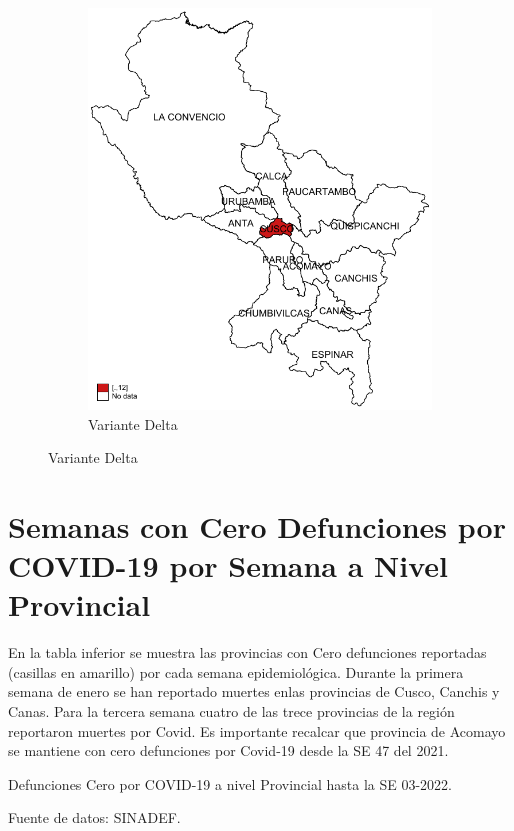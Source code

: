 \documentclass[12pt,a4paper,openany]{book}
\begin{document}
\begin{figure}[h]
\begin{subfigure}[b]{0.40\textwidth}
				\includegraphics[width=\textwidth]{../figuras/variantes_provincial_omicron.pdf}
				\caption{Variante Delta}
			\end{subfigure}
			\end{figure}

\clearpage


\clearpage
	\section*{Semanas con Cero Defunciones por COVID-19 por Semana a Nivel Provincial}
	
	\noindent En la tabla inferior se muestra las provincias con Cero defunciones reportadas (casillas en amarillo) por cada semana epidemiológica. Durante la primera semana de enero se han reportado muertes enlas provincias de Cusco, Canchis y Canas. Para la tercera semana cuatro de las trece provincias de la región reportaron muertes por Covid. Es importante recalcar que provincia de Acomayo se mantiene con cero defunciones por Covid-19 desde la SE 47 del 2021.
	\begin{table}[h]		\caption{Defunciones Cero por COVID-19 a nivel Provincial hasta la SE 03-2022.}
		\resizebox{\textwidth}{!}{%
			
		}
		{\footnotesize {Fuente de datos: SINADEF.}}
	\end{table}
\pagebreak
\end{document}
